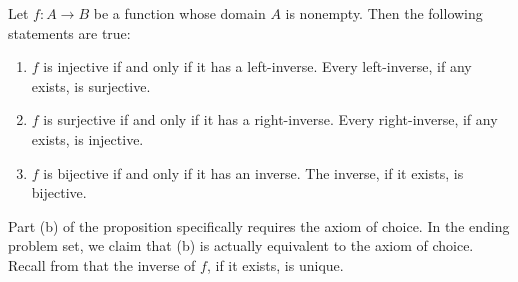 \begin{prop}\label{ch1thm_fn_inverses_vs_ject}
	Let $f:A\rightarrow B$ be a function whose domain $A$ is nonempty. 
	Then the following statements are true:
	\begin{enumerate}[itemsep=-0.4ex, label=\textup{(\alph*)}]
		\item $f$ is injective if and only if it has a left-inverse.
		Every left-inverse, if any exists, is surjective.
		\item $f$ is surjective if and only if it has a right-inverse.
		Every right-inverse, if any exists, is injective.
		\item $f$ is bijective if and only if it has an inverse.
		The inverse, if it exists, is bijective. 
	\end{enumerate}
\end{prop}
\begin{remark}
	Part (b) of the proposition specifically requires the axiom of choice. 
	In the ending problem set, we claim that (b) is actually equivalent to the axiom of choice. 
	Recall from  that the inverse of $f$, if it exists, is unique. 
\end{remark}
